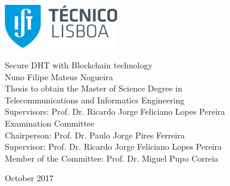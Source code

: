 \thispagestyle {empty}

\includegraphics[width=5.0cm]{Logo.png}

\begin{center}
%

\vspace{4.5cm}
{\FontLb Secure DHT with Blockchain technology} \\
\vspace{2.6cm}
{\FontMb Nuno Filipe Mateus Nogueira} \\
\vspace{1.9cm}
{\FontLn Thesis to obtain the Master of Science Degree in} \\
\vspace{0.3cm}
{\FontLb Telecommunications and Informatics Engineering} \\
\vspace{2cm}
{\FontSn Supervisors: Prof. Dr. Ricardo Jorge Feliciano Lopes Pereira} \\
\vspace{2.5cm}
{\FontMb Examination Committee} \\
\vspace{0.3cm}
{\FontSn %
  Chairperson:        Prof. Dr. Paulo Jorge Pires Ferreira \\
Supervisor:        Prof. Dr. Ricardo Jorge Feliciano Lopes Pereira \\
Member of the Committee:            Prof. Dr. Miguel Pupo Correia \\
}
\vspace{1.5cm}

{\FontMb October 2017} \\
%
\end{center}

\cleardoublepage

\restoregeometry
